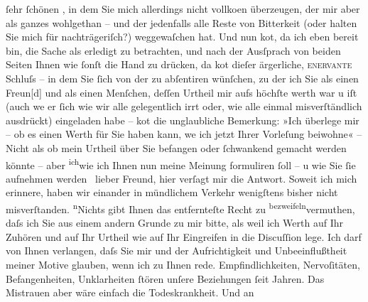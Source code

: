 \begin{ledgroupsized}[t]{13cm}
               ſehr {\pb}ſchönen \label{K_L02989-1v}\label{K_L02989-1h}, in dem Sie mich allerdings nicht vollko{\geminationm}en
               überzeugen, der mir aber als ganzes wohlgethan – und der jedenfalls alle Reste von
               Bitterkeit (oder halten Sie mich für nachträgeriſch?) weggewaſchen hat. Und nun ko{\geminationm}t, da ich eben bereit bin, die Sache als erledigt zu
               betrachten, und nach der Ausſprach von beiden Seiten {\pb}Ihnen wie ſonſt die Hand zu drücken, da ko{\geminationm}t dieſer ärgerliche, \textsc{enervante} Schluſs – in dem Sie ſich von der \label{K_L02989-2v}\label{K_L02989-2h} zu abſentiren wünſchen, zu der ich Sie als einen Freun{[}d{]}
               und als einen Menſchen, deſſen Urtheil mir aufs höchſte werth war u iſt (auch we{\geminationn} er ſich wie wir alle {\pb}gelegentlich irrt oder, wie alle einmal
               misverſtändlich ausdrückt) eingeladen habe – ko{\geminationm}t die
               unglaubliche Bemerkung: »Ich überlege mir – ob es einen Werth für Sie haben kann,
                  we{\geminationn} ich jetzt Ihrer Vorleſung beiwohne{\dotstwo}« – Nicht als ob mein Urtheil über Sie befangen oder
               ſchwankend gemacht werden könnte – aber \substVorne{}\textsuperscript{ich}\substDazwischen{}wie\substHinten{} ich Ihnen nun meine {\pb}Meinung
               formuliren ſoll – u wie Sie ſie aufnehmen werden {\dotsfive} lieber Freund, hier verſagt mir die Antwort. Soweit ich
               mich erinnere, haben wir einander in mündlichem Verkehr wenigſtens bisher nicht
               misverſtanden. \substVorne{}\textsuperscript{n}\substDazwischen{}N\substHinten{}ichts gibt Ihnen das
               entfernteſte Recht zu \substVorne{}\textsuperscript{bezweifeln}{\allowbreak}\substDazwischen{}vermuthen\substHinten{}, daſs ich Sie aus einem andern {\pb}Grunde zu mir bitte, als weil ich Werth auf Ihr Zuhören und auf Ihr Urtheil wie auf
               Ihr Eingreifen in die Discuſſion lege. Ich darf von Ihnen verlangen, daſs Sie mir und
               der Aufrichtigkeit \introOben{}und Unbeeinflußtheit\introOben{} meiner Motive
               glauben, wenn ich zu Ihnen rede. Empfindlichkeiten, Nervoſitäten, Befan{\pb}genheiten, Unklarheiten ſtören unſere
               Beziehungen ſeit Jahren. Das Mistrauen aber wäre einfach die Todeskrankheit. Und an

\end{ledgroupsized}
